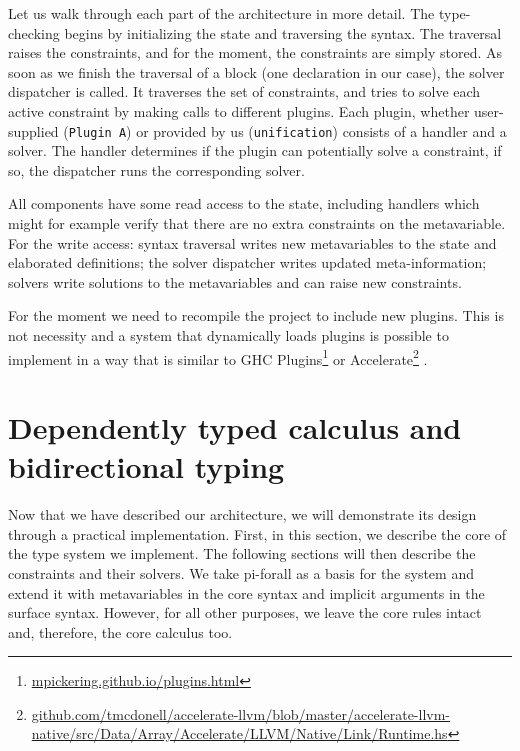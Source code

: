 Let us walk through each part of the architecture in more detail. The
type-checking begins by initializing the state and traversing the
syntax. The traversal raises the constraints, and for the moment, the
constraints are simply stored. As soon as we finish the traversal of a
block (one declaration in our case), the solver dispatcher is called. It
traverses the set of constraints, and tries to solve each active
constraint by making calls to different plugins. Each plugin, whether
user-supplied (\texttt{Plugin\ A}) or provided by us
(\texttt{unification}) consists of a handler and a solver. The handler
determines if the plugin can potentially solve a constraint, if so, the
dispatcher runs the corresponding solver.

All components have some read access to the state, including handlers
which might for example verify that there are no extra constraints on
the metavariable. For the write access: syntax traversal writes new
metavariables to the state and elaborated definitions; the solver
dispatcher writes updated meta-information; solvers write solutions to
the metavariables and can raise new constraints.

For the moment we need to recompile the project to include new plugins.
This is not necessity and a system that dynamically loads plugins is
possible to implement in a way that is similar to GHC Plugins\footnote{\href{https://mpickering.github.io/plugins.html}{mpickering.github.io/plugins.html}}
or Accelerate\footnote{\href{https://github.com/tmcdonell/accelerate-llvm/blob/master/accelerate-llvm-native/src/Data/Array/Accelerate/LLVM/Native/Link/Runtime.hs\#L40}{github.com/tmcdonell/accelerate-llvm/blob/master/accelerate-llvm-native/src/Data/Array/Accelerate/LLVM/Native/Link/Runtime.hs}}
\citep{mcdonellTypesafeRuntimeCode2015}.

\hypertarget{sec:bidirectional}{%
\section{Dependently typed calculus and bidirectional
typing}\label{sec:bidirectional}}

Now that we have described our architecture, we will demonstrate its
design through a practical implementation. First, in this section, we
describe the core of the type system we implement. The following
sections will then describe the constraints and their solvers. We take
pi-forall \citep{weirichImplementingDependentTypes2022} as a basis for
the system and extend it with metavariables in the core syntax and
implicit arguments in the surface syntax. However, for all other
purposes, we leave the core rules intact and, therefore, the core
calculus too.

